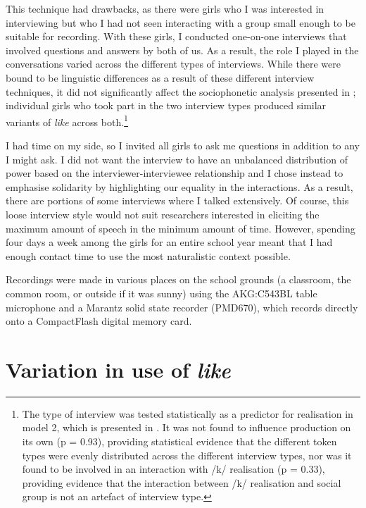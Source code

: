 This technique had drawbacks, as there were girls who I was interested in interviewing but who I had not seen interacting with a group small enough to be suitable for recording. With these girls, I conducted one-on-one interviews that involved questions and answers by both of us. As a result, the role I played in the conversations varied across the different types of interviews. While there were bound to be linguistic differences as a result of these different interview techniques, it did not significantly affect the sociophonetic analysis presented in ; individual girls who took part in the two interview types produced similar variants of \textit{like} across both.\footnote{The type of interview was tested statistically as a predictor for realisation in model 2, which is presented in . It was not found to influence production on its own (p = 0.93), providing statistical evidence that the different token types were evenly distributed across the different interview types, nor was it found to be involved in an interaction with /k/ realisation (p = 0.33), providing evidence that the interaction between /k/ realisation and social group is not an artefact of interview type.} 

I had time on my side, so I invited all girls to ask me questions in addition to any I might ask. I did not want the interview to have an unbalanced distribution of power based on the interviewer-interviewee relationship and I chose instead to emphasise solidarity by highlighting our equality in the interactions. As a result, there are portions of some interviews where I talked extensively. Of course, this loose interview style would not suit researchers interested in eliciting the maximum amount of speech in the minimum amount of time. However, spending four days a week among the girls for an entire school year meant that I had enough contact time to use the most naturalistic context possible.

Recordings were made in various places on the school grounds (a classroom, the common room, or outside if it was sunny) using the AKG:C543BL table microphone  and a Marantz solid state recorder (PMD670), which records directly onto a CompactFlash digital memory card. 


\section{Variation in use of \textit{like}}\label{prod-like}


